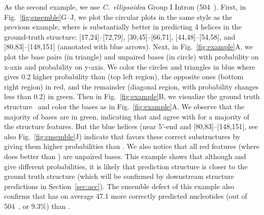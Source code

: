 As the second example, we use %
{\it C.~ellipsoidea} Group I Intron (504~\nts).
First, in Fig.~\ref{fig:ensemble}G--J, we plot the circular plots in the same style as the previous example,
where \linearpartition is substantially better in predicting 4 helices in the ground-truth structure:
[17,24]--[72,79], [30,45]--[66,71], [44,48]--[54,58], and [80,83]--[148,151] (annotated with blue arrows).
Next, in Fig.~\ref{fig:example}A, 
we plot the base pairs (in triangle) and unpaired bases (in circle) 
with \rnafold probability on x-axis and \linearpartition probability on y-axis.
We color the circles and triangles in blue where \linearpartition gives 0.2 higher probability 
than \rnafold %
(top left region),
the opposite ones (bottom right region) in red,
and the remainder (diagonal region, with probability changes less than 0.2)
in green.
Then in Fig.~\ref{fig:example}B,
we visualize the ground truth structure~\cite{Cannone+:2002} and color the bases as in Fig.~\ref{fig:example}A.
We observe that the majority of bases are in green, indicating that \rnafold and \linearpartition
agree  with for a majority of the structure features. 
But the blue helices (near 5'-end and [80,83]--[148,151], see also Fig.~\ref{fig:ensemble}J)
indicate that \linearpartition favors these correct substructures by giving them higher probabilities than \rnafold.
We also notice that all red features (where \rnafold does better than \linearpartition) are unpaired bases.
This example shows that although \linearpartition and \rnafold give different probabilities, %
it is likely that \linearpartition prediction structure is closer to the ground truth structure
(which will be confirmed by downstream structure predictions in Section~\ref{sec:acc}).
The ensemble defect of this example also confirms
that \linearpartition has on average 47.1 more correctly predicted nucleotides (out of 504~\nts, or 9.3\%)
than \rnafold.




